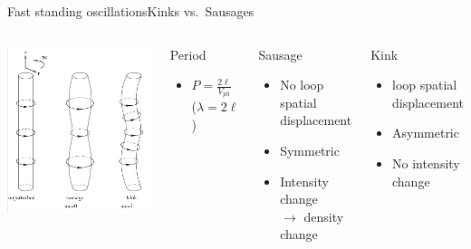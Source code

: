 \documentclass[11pt,table]{beamer}
\begin{document}
\begin{frame}{Fast standing oscillations}{Kinks vs.\ Sausages}
    \begin{columns}
            \includegraphics[width=\textwidth]{kink_saus.png}
        \column{0.45\paperwidth}
        \vspace{-0.5in}
        \begin{block}{Period}
            \begin{itemize}
                \item $P=\frac{2\ell}{V_{ph}}$
                    ($\lambda=2\ell$)
            \end{itemize}
        \end{block}
        \begin{block}{Sausage}
            \begin{itemize}
                \item No loop spatial displacement
                \item Symmetric
                \item Intensity change\\ $\rightarrow$ density change
            \end{itemize}
        \end{block}
        \begin{block}{Kink}
            \begin{itemize}
                \item loop spatial displacement
                \item Asymmetric
                \item No intensity change
            \end{itemize}
        \end{block}
\end{columns}
\end{frame}%
\end{document}
